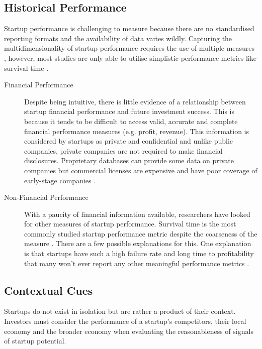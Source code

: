 \subsection{Historical Performance}

Startup performance is challenging to measure because there are no standardised reporting formats and the availability of data varies wildly. Capturing the multidimensionality of startup performance requires the use of multiple measures \cite{wiklund2005}, however, most studies are only able to utilise simplistic performance metrics like survival time \cite{raz2007, song2012, gloor2013}.

\begin{description}

\item[Financial Performance]

Despite being intuitive, there is little evidence of a relationship between startup financial performance and future investment success. This is because it tends to be difficult to access valid, accurate and complete financial performance measures (e.g. profit, revenue). This information is considered by startups as private and confidential and unlike public companies, private companies are not required to make financial disclosures. Proprietary databases can provide some data on private companies but commercial licenses are expensive and have poor coverage of early-stage companies \cite{artemchik2015}.

\item[Non-Financial Performance]

With a paucity of financial information available, researchers have looked for other measures of startup performance. Survival time is the most commonly studied startup performance metric despite the coarseness of the measure \cite{song2012,an2015,gimmon2010}. There are a few possible explanations for this. One explanation is that startups have such a high failure rate and long time to profitability that many won't ever report any other meaningful performance metrics \cite{sahlman2010}.

\end{description}

\subsection{Contextual Cues}

Startups do not exist in isolation but are rather a product of their context. Investors must consider the performance of a startup's competitors, their local economy and the broader economy when evaluating the reasonableness of signals of startup potential.

